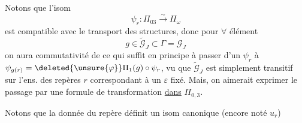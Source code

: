 Notons que l'isom
\[
\psi_r:\Pi_{03}\xrightarrow{\sim}\Pi_\omega
\]
est compatible avec le transport des structures,  donc pour $\forall$ élément
\[
g\in\widetilde{\mathcal G}_J\subset\Gamma=\mathcal G_J
\]
\inserted{
\[
\begin{aligned}
\widetilde{\mathcal G}_J=\Gamma_{P_\varepsilon}&=\left\{(g,\tau^{\unsure{\operatorname{sg}g|\alpha}})\in\mathcal G_J\times\deleted{\{1,\tau\}}\inserted{\mathbb Z/2\mathbb Z}\ \middle|\ \begin{array}{l}\alpha=0\text{ si }\operatorname{sg}g=1\\\alpha=1\text{ si }\operatorname{sg}g=-1\end{array}\right\}\\
&=\{g\in\Gamma\mid \unsure{g_\varepsilon^{(\varepsilon)}|g(\varepsilon)}=\operatorname{id}_{\unsure{\varepsilon}}\}
\end{aligned}
\]
}
on aura commutativité de
ce qui suffit en principe à passer d'un $\psi_r$ à $\psi_{g(r)}=\deleted{\unsure{\varphi}}\Pi_1(g)\circ\psi_r$, vu que  $\widetilde{\mathcal G}_J$ est simplement transitif sur l'ens. des repères $r$ correspondant à un $\varepsilon$ fixé. Mais, on aimerait exprimer le passage par une formule de transformation \uline{dans} $\Pi_{0,3}$.

Notons que la donnée du repère  définit un isom canonique (encore noté $u_r$)
